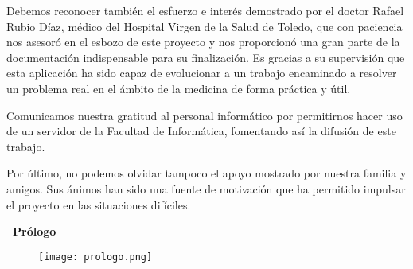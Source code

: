\documentclass[11pt,spanish,
		listoftables,listoffigures]
		{tfgplantilla}
\begin{document}
Debemos reconocer también el esfuerzo e interés demostrado por el doctor Rafael Rubio Díaz, médico del Hospital Virgen de la Salud de Toledo, que con paciencia nos asesoró en el esbozo de este proyecto y nos proporcionó una gran parte de la documentación indispensable para su finalización. Es gracias a su supervisión que esta aplicación ha sido capaz de evolucionar a un trabajo encaminado a resolver un problema real en el ámbito de la medicina de forma práctica y útil.

Comunicamos nuestra gratitud al personal informático por permitirnos hacer uso de un servidor de la Facultad de Informática, fomentando así la difusión de este trabajo.

Por último, no podemos olvidar tampoco el apoyo mostrado por nuestra familia y amigos. Sus ánimos han sido una fuente de motivación que ha permitido impulsar el proyecto en las situaciones difíciles. 

\cleardoublepage
{\par\hfill \sffamily\bfseries\Huge\ Prólogo}

\begin{figure}[h]
   \centering
       \texttt{[image: prologo.png]}    
\end{figure}

%
\end{document}
